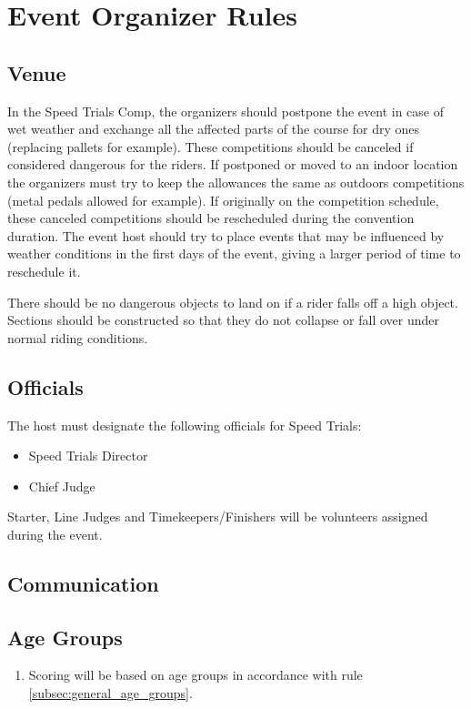 \chapter{Event Organizer Rules}

\section{Venue}

In the Speed Trials Comp, the organizers should postpone the event in case of wet weather and exchange all the affected parts of the course for dry ones (replacing pallets for example).
These competitions should be canceled if considered dangerous for the riders.
If postponed or moved to an indoor location the organizers must try to keep the allowances the same as outdoors competitions (metal pedals allowed for example).
If originally on the competition schedule, these canceled competitions should be rescheduled during the convention duration.
The event host should try to place events that may be influenced by weather conditions in the first days of the event, giving a larger period of time to reschedule it.

There should be no dangerous objects to land on if a rider falls off a high object.
Sections should be constructed so that they do not collapse or fall over under normal riding conditions.

\section{Officials}

The host must designate the following officials for Speed Trials:
\begin{itemize}
\item Speed Trials Director
\item Chief Judge
\end{itemize}
Starter, Line Judges and Timekeepers/Finishers will be volunteers assigned during the event.
\section{Communication}

\section{Age Groups}

\begin{enumerate}[leftmargin=1.5em,labelsep=*]
	\item Scoring will be based on age groups in accordance with rule \ref{subsec:general_age_groups}.
\end{enumerate}

